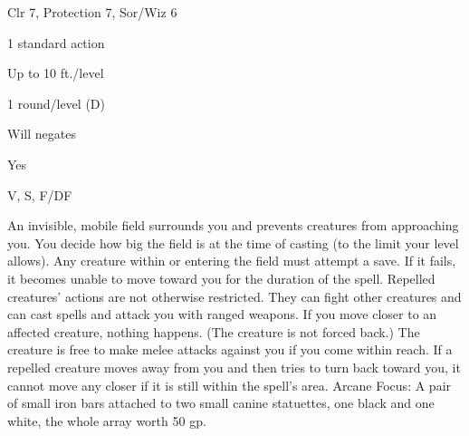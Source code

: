 
\begin{description*}
\item[Level:] Clr 7, Protection 7, Sor/Wiz 6
\item[Casting Time:] 1 standard action
\item[Range:] Up to 10 ft./level
\item[Duration:] 1 round/level (D)
\item[Saving Throw:] Will negates
\item[Spell Resistance:] Yes
\item[Components:] V, S, F/DF
\end{description*}

An invisible, mobile field surrounds you and prevents creatures from approaching
you. You decide how big the field is at the time of casting (to the limit your
level allows). Any creature within or entering the field must attempt a save. If
it fails, it becomes unable to move toward you for the duration of the spell. Repelled
creatures' actions are not otherwise restricted.
They can fight other creatures and can cast spells and attack you with ranged weapons.
If you move closer to an affected creature, nothing happens. (The creature is not
forced back.) The creature is free to make melee attacks against you if you come
within reach. If a repelled creature moves away from you and then tries to turn
back toward you, it cannot move any closer if it is still within the spell's area.
Arcane Focus: A pair of small iron bars attached to two small canine statuettes,
one black and one white, the whole array worth 50 gp.
